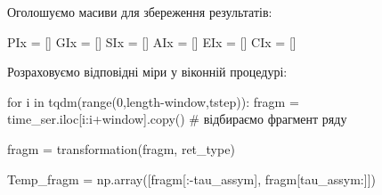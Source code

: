 \documentclass[
  letterpaper,
]{report}
\newenvironment{Shaded}{\begin{snugshade}}{\end{snugshade}}
\newcommand{\BuiltInTok}[1]{\textcolor[rgb]{0.00,0.23,0.31}{#1}}
\newcommand{\CommentTok}[1]{\textcolor[rgb]{0.37,0.37,0.37}{#1}}
\newcommand{\ControlFlowTok}[1]{\textcolor[rgb]{0.00,0.23,0.31}{#1}}
\newcommand{\DecValTok}[1]{\textcolor[rgb]{0.68,0.00,0.00}{#1}}
\newcommand{\KeywordTok}[1]{\textcolor[rgb]{0.00,0.23,0.31}{#1}}
\newcommand{\NormalTok}[1]{\textcolor[rgb]{0.00,0.23,0.31}{#1}}
\newcommand{\OperatorTok}[1]{\textcolor[rgb]{0.37,0.37,0.37}{#1}}
\begin{document}
Оголошуємо масиви для збереження результатів:

\begin{Shaded}
\begin{Highlighting}[]
\NormalTok{PIx }\OperatorTok{=}\NormalTok{ []}
\NormalTok{GIx }\OperatorTok{=}\NormalTok{ []}
\NormalTok{SIx }\OperatorTok{=}\NormalTok{ []}
\NormalTok{AIx }\OperatorTok{=}\NormalTok{ []}
\NormalTok{EIx }\OperatorTok{=}\NormalTok{ []}
\NormalTok{CIx }\OperatorTok{=}\NormalTok{ []}
\end{Highlighting}
\end{Shaded}

Розраховуємо відповідні міри у віконній процедурі:

\begin{Shaded}
\begin{Highlighting}[]
\ControlFlowTok{for}\NormalTok{ i }\KeywordTok{in}\NormalTok{ tqdm(}\BuiltInTok{range}\NormalTok{(}\DecValTok{0}\NormalTok{,length}\OperatorTok{{-}}\NormalTok{window,tstep)):}
\NormalTok{    fragm }\OperatorTok{=}\NormalTok{ time\_ser.iloc[i:i}\OperatorTok{+}\NormalTok{window].copy() }\CommentTok{\# відбираємо фрагмент ряду }
    
\NormalTok{    fragm }\OperatorTok{=}\NormalTok{ transformation(fragm, ret\_type)}
    
\NormalTok{    Temp\_fragm }\OperatorTok{=}\NormalTok{ np.array([fragm[:}\OperatorTok{{-}}\NormalTok{tau\_assym], fragm[tau\_assym:]])}
    

\end{Highlighting}
\end{Shaded}
\end{document}
